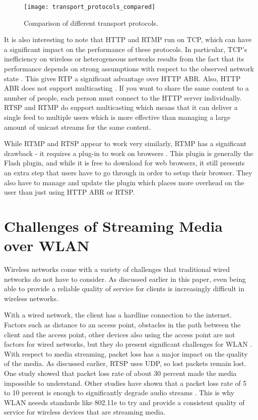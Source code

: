 \documentclass[12pt]{article}
\begin{document}
\begin{figure}[htb]
  \begin{center}
    \texttt{[image: transport\_protocols\_compared]}
    \caption{Comparison of different transport protocols.}
    \label{fig:transport_protocols_compared}
  \end{center}
\end{figure}


It is also interesting to note that HTTP and RTMP run on TCP, which can have a significant impact on the performance of these protocols.  In particular, TCP’s inefficiency on wireless or heterogeneous networks results from the fact that its performance depends on strong assumptions with respect to the observed network state \cite{6336461}.  This gives RTP a significant advantage over HTTP ABR.  Also, HTTP ABR does not support multicasting \cite{7346220120120201}.  If you want to share the same content to a number of people, each person must connect to the HTTP server individually.  RTSP and RTMP do support multicasting which means that it can deliver a single feed to multiple users which is more effective than managing a large amount of unicast streams for the same content.

While RTMP and RTSP appear to work very similarly, RTMP has a significant drawback - it requires a plug-in to work on browsers \cite{7346220120120201}.
This plugin is generally the Flash plugin, and while it is free to download for web browsers, it still presents an extra step that users have to go through in order to setup their browser.  They also have to manage and update the plugin which places more overhead on the user than just using HTTP ABR or RTSP.

\section{Challenges of Streaming Media over WLAN}
Wireless networks come with a variety of challenges that traditional wired networks do not have to consider.  As discussed earlier in this paper, even being able to provide a reliable quality of service for clients is increasingly difficult in wireless networks.

With a wired network, the client has a hardline connection to the internet.  Factors such as distance to an access point, obstacles in the path between the client and the access point, other devices also using the access point are not factors for wired networks, but they do present significant challenges for WLAN \cite{7146968}.  With respect to media streaming, packet loss has a major impact on the quality of the media.  As discussed earlier, RTSP uses UDP, so lost packets remain lost.  One study showed that packet loss rate of about 30 percent made the media impossible to understand.  Other studies have shown that a packet loss rate of 5 to 10 percent is enough to significantly degrade audio streams \cite{lantowlan}.  This is why WLAN neeeds standards like 802.11e to try and provide a consistent quality of service for wireless devices that are streaming media.
\end{document}
